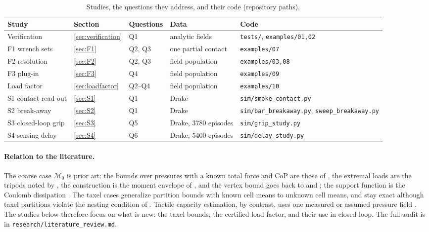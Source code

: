 \documentclass[11pt,a4paper]{article}
\newcommand{\M}{\mathcal M}
\newcommand{\code}[1]{\texttt{#1}}
\begin{document}
\begin{table}[tbp]
\centering\small
\begin{adjustbox}{max width=\linewidth}\begin{tabular}{@{}lllll@{}}
\toprule
Study & Section & Questions & Data & Code \\
\midrule
Verification & \ref{sec:verification} & Q1 & analytic fields & \code{tests/}, \code{examples/01,02} \\
F1 wrench sets & \ref{sec:F1} & Q2, Q3 & one partial contact & \code{examples/07} \\
F2 resolution & \ref{sec:F2} & Q2, Q3 & field population & \code{examples/03,08} \\
F3 plug-in & \ref{sec:F3} & Q4 & field population & \code{examples/09} \\
Load factor & \ref{sec:loadfactor} & Q2--Q4 & field population & \code{examples/10} \\
S1 contact read-out & \ref{sec:S1} & Q1 & Drake & \code{sim/smoke\_contact.py} \\
S2 break-away & \ref{sec:S2} & Q1 & Drake & \code{sim/bar\_breakaway.py}, \code{sweep\_breakaway.py} \\
S3 closed-loop grip & \ref{sec:S3} & Q5 & Drake, 3780 episodes & \code{sim/grip\_study.py} \\
S4 sensing delay & \ref{sec:S4} & Q6 & Drake, 5400 episodes & \code{sim/delay\_study.py} \\
\bottomrule
\end{tabular}\end{adjustbox}
\caption{Studies, the questions they address, and their code (repository paths).}
\label{tab:studies}
\end{table}

\paragraph{Relation to the literature.} The coarse case $\M_0$ is prior art: the bounds over pressures with a known total force and CoP
are those of \citet{peshkin1988motion}, the extremal loads are the tripods noted by \citet{alexander1993bounds}, the construction is the
moment envelope of \citet{huang2017exact}, and the vertex bound goes back to \citet{madansky1959bounds} and \citet{gassmann1986tight}; the support
function is the Coulomb dissipation \citep{goyal1991planar,alexander1993bounds}. The taxel cases generalize partition bounds with known cell
means \citep{gassmann1986tight,birge1983designing} to unknown cell means, and stay exact although taxel partitions violate the nesting
condition of \citet{wiesemann2014distributionally}. Tactile capacity estimation, by contrast, uses one measured or assumed pressure field
\citep{bicchi1988integrated,howe1996practical,costanzo2020two,arslan2025inhand}. The studies below therefore focus on what is new: the taxel
bounds, the certified load factor, and their use in closed loop. The full audit is in \code{research/literature\_review.md}.
\end{document}
